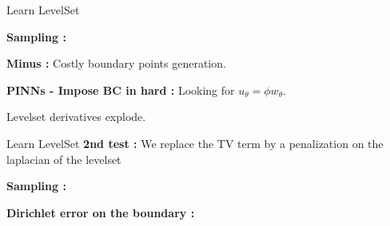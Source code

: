 \begin{frame}{Learn LevelSet }	
	\begin{minipage}{0.26\linewidth}
		\textbf{Sampling :}
		\begin{center}
		\end{center}
	\end{minipage} \quad \begin{minipage}{0.70\linewidth}
		\centering
		
		\footnotesize\flushleft\vspace{-10pt}
		\qquad\qquad \textbf{Minus :} Costly boundary points generation.
	\end{minipage}
	
	\vspace{10pt}
	
	\textbf{PINNs - Impose BC in hard :} Looking for $u_\theta=\phi w_\theta$.
	\begin{center}
	\end{center}
	
	\vspace{-10pt}
	Levelset derivatives explode.
\end{frame}

\begin{frame}{Learn LevelSet }
	\textbf{2nd test :} We replace the TV term by a penalization on the laplacian of the levelset

	\begin{center}
	\end{center}

	\begin{minipage}{0.28\linewidth}
		\centering
		\textbf{Sampling :}
		
	\end{minipage} \quad \begin{minipage}{0.68\linewidth}
		\centering
		\textbf{Dirichlet error on the boundary :}
		
	\end{minipage}


\end{frame}

